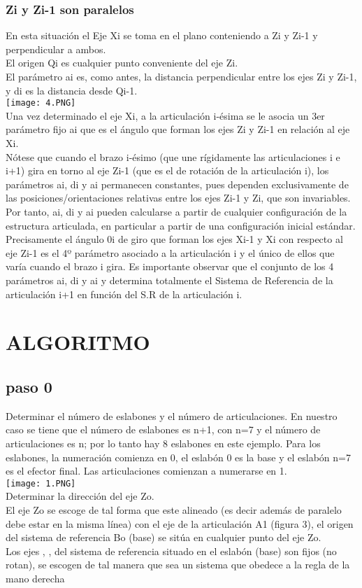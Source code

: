 \documentclass[12pt,a4paper]{article}
\begin{document}
\subsubsection{Zi y Zi-1  son paralelos}
En esta situación el Eje Xi se toma en el plano conteniendo a Zi y Zi-1 y perpendicular a ambos.\\
El origen Qi es cualquier punto conveniente del eje Zi.\\
El parámetro ai es, como antes, la distancia perpendicular entre los ejes Zi y Zi-1, y di es la distancia desde Qi-1.\\
\texttt{[image: 4.PNG]} \\
Una vez determinado el eje Xi, a la articulación i-ésima se le asocia un 3er parámetro fijo ai que es el ángulo que forman los ejes Zi y Zi-1 en relación al eje Xi.\\
Nótese que cuando el brazo i-ésimo (que une rígidamente las articulaciones i e i+1) gira en torno al eje Zi-1 (que es el de rotación de la articulación i), los parámetros ai, di y ai permanecen constantes, pues dependen exclusivamente de las posiciones/orientaciones relativas entre los ejes Zi-1 y Zi, que son invariables. Por tanto, ai, di y ai pueden calcularse a partir de cualquier configuración de la estructura articulada, en particular a partir de una configuración inicial estándar. Precisamente el ángulo 0i de giro que forman los ejes Xi-1 y Xi con respecto al eje Zi-1 es el 4º parámetro asociado a la articulación i y el único de ellos que varía cuando el brazo i gira.
Es importante observar que el conjunto de los 4 parámetros ai, di y ai y
 determina totalmente el Sistema 
de Referencia de la articulación i+1 en función del S.R de la articulación i.





\section{ALGORITMO}
\subsection{paso 0}
Determinar el número de eslabones y el número de articulaciones. En nuestro caso se tiene que el número de eslabones es n+1, con n=7 y el número de articulaciones es n; por lo tanto hay 8 eslabones en este ejemplo. Para los eslabones, la numeración comienza en 0, el eslabón 0 es la base y el eslabón n=7 es el efector final. Las articulaciones comienzan a numerarse en 1.\\
\texttt{[image: 1.PNG]} \\
Determinar la dirección del eje Zo.\\
El eje Zo se escoge de tal forma que este alineado (es decir además de paralelo debe estar en la misma línea) con el eje de la articulación A1 (figura 3),  el origen del sistema de referencia Bo (base) se sitúa en cualquier punto del eje Zo.\\
Los ejes  , ,   del sistema de referencia  situado en el eslabón   (base) son fijos (no rotan), se escogen de tal manera que sea un sistema que obedece a la regla de la mano derecha 
\end{document}
